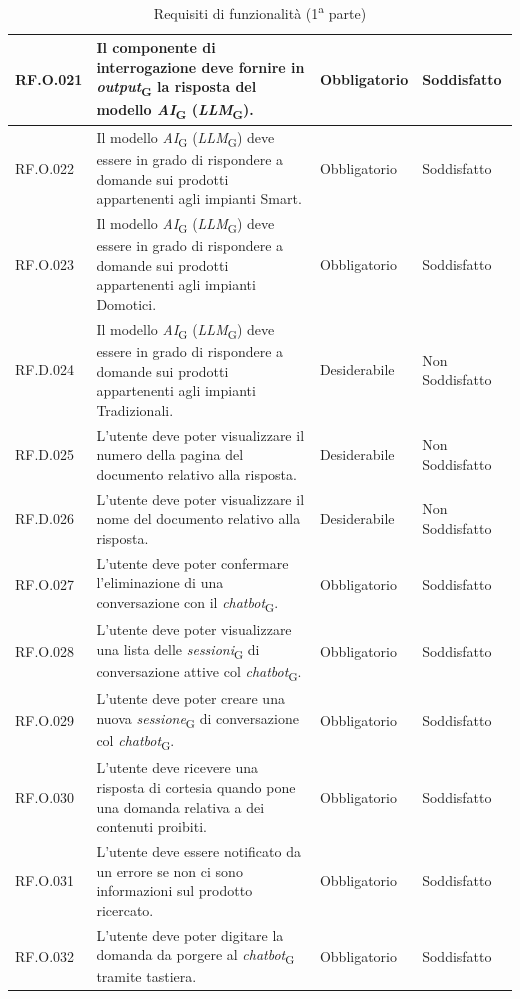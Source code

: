 \begin{table}[H]
\centering
    \begin{tabular}{|C{2.7cm}|L{6.5cm}|C{2.7cm}|C{2.7cm}|}
        \hline
        RF.O.021 & Il componente di interrogazione deve fornire in \textit{output}\textsubscript{G} la risposta del modello \textit{AI}\textsubscript{G} (\textit{LLM}\textsubscript{G}).
         & Obbligatorio & Soddisfatto \\
        \hline
        RF.O.022 & Il modello \textit{AI}\textsubscript{G} (\textit{LLM}\textsubscript{G}) deve essere in grado di rispondere a domande sui prodotti appartenenti agli impianti Smart.
         & Obbligatorio & Soddisfatto \\
        \hline
        RF.O.023 & Il modello \textit{AI}\textsubscript{G} (\textit{LLM}\textsubscript{G}) deve essere in grado di rispondere a domande sui prodotti appartenenti agli impianti Domotici.
         & Obbligatorio & Soddisfatto \\
         \hline
        RF.D.024 & Il modello \textit{AI}\textsubscript{G} (\textit{LLM}\textsubscript{G}) deve essere in grado di rispondere a domande sui prodotti appartenenti agli impianti Tradizionali.
         & Desiderabile & Non Soddisfatto \\
         \hline
        RF.D.025 & L’utente deve poter visualizzare il numero della pagina del documento relativo alla risposta.
        & Desiderabile & Non Soddisfatto \\
        \hline
        RF.D.026 & L’utente deve poter visualizzare il nome del documento relativo alla
        risposta.
         & Desiderabile & Non Soddisfatto \\
        \hline
        RF.O.027 & L’utente deve poter confermare l'eliminazione di una conversazione con il \textit{chatbot}\textsubscript{G}.
         & Obbligatorio & Soddisfatto \\
        \hline

        RF.O.028 & L’utente deve poter visualizzare una lista delle
        \textit{sessioni}\textsubscript{G} di conversazione attive col \textit{chatbot}\textsubscript{G}.
         & Obbligatorio & Soddisfatto \\
        \hline
        RF.O.029 & L’utente deve poter creare una nuova \textit{sessione}\textsubscript{G} di conversazione col \textit{chatbot}\textsubscript{G}.
         & Obbligatorio & Soddisfatto \\
        \hline
        RF.O.030 & L’utente deve ricevere una risposta di cortesia quando pone una domanda relativa a dei contenuti proibiti.
         & Obbligatorio & Soddisfatto \\
        \hline
        RF.O.031 & L'utente deve essere notificato da un errore se non ci sono informazioni sul prodotto ricercato. & Obbligatorio & Soddisfatto \\
        \hline
        RF.O.032 & L’utente deve poter digitare la domanda da porgere al \textit{chatbot}\textsubscript{G} tramite tastiera.
         & Obbligatorio & Soddisfatto \\
        \hline
        \end{tabular}
    \caption{Requisiti di funzionalità (1\textsuperscript{a}  parte)}
\end{table}
